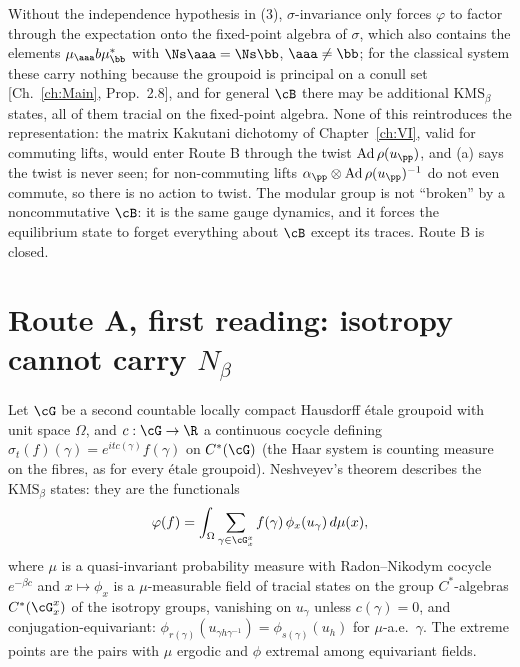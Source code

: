 \begin{remark}
Without the independence hypothesis in (3), $\sigma$-invariance only forces $\varphi$ to
factor through the expectation onto the fixed-point algebra of $\sigma$, which also
contains the elements $\mu_\aaa b\mu_\bb^*$ with $\Ns\aaa=\Ns\bb$, $\aaa\ne\bb$; for the
classical system these carry nothing because the groupoid is principal on a conull set
[Ch.~\ref{ch:Main}, Prop.~2.8], and for general $\cB$ there may be additional $\mathrm{KMS}_\beta$
states, all of them tracial on the fixed-point algebra. None of this reintroduces the
representation: the matrix Kakutani dichotomy of Chapter~\ref{ch:VI}, valid for commuting lifts,
would enter Route B through the twist $\mathrm{Ad}\,\rho(u_\pp)$, and (a) says the twist is
never seen; for non-commuting lifts $\alpha_\pp\otimes\mathrm{Ad}\,\rho(u_\pp)^{-1}$ do not
even commute, so there is no action to twist. The modular group is not ``broken'' by a
noncommutative $\cB$: it is the same gauge dynamics, and it forces the equilibrium state
to forget everything about $\cB$ except its traces. Route B is closed.
\end{remark}

\section{Route A, first reading: isotropy cannot carry $N_\beta$}\label{XXVII:sec:iso}

Let $\cG$ be a second countable locally compact Hausdorff \'etale groupoid with unit space
$\Omega$, and $c:\cG\to\R$ a continuous cocycle defining $\sigma_t(f)(\gamma)=e^{itc(\gamma)}f(\gamma)$
on $C^*(\cG)$ (the Haar system is counting measure on the fibres, as for every \'etale
groupoid). Neshveyev's theorem \cite[Thm.~1.3]{Nesh13} describes the $\mathrm{KMS}_\beta$
states: they are the functionals
\begin{equation}\label{XXVII:eq:nesh}
\varphi(f)=\int_\Omega\sum_{\gamma\in\cG_x^x}f(\gamma)\,\phi_x(u_\gamma)\,d\mu(x),
\end{equation}
where $\mu$ is a quasi-invariant probability measure with Radon--Nikodym cocycle $e^{-\beta c}$
and $x\mapsto\phi_x$ is a $\mu$-measurable field of tracial states on the group
$C^*$-algebras $C^*(\cG_x^x)$ of the isotropy groups, vanishing on $u_\gamma$ unless
$c(\gamma)=0$, and conjugation-equivariant: $\phi_{r(\gamma)}(u_{\gamma h\gamma^{-1}})=\phi_{s(\gamma)}(u_h)$
for $\mu$-a.e.\ $\gamma$. The extreme points are the pairs with $\mu$ ergodic and $\phi$
extremal among equivariant fields.

